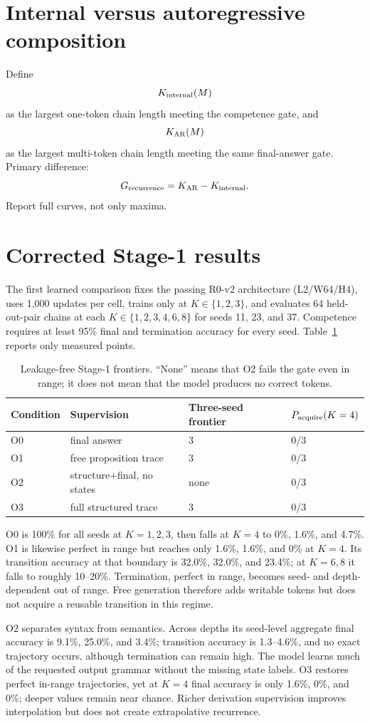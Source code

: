 \documentclass[10pt]{article}
\begin{document}
\section{Internal versus autoregressive composition}
Define
\[
K_{\rm internal}(M)
\]
as the largest one-token chain length meeting the competence gate, and
\[
K_{\rm AR}(M)
\]
as the largest multi-token chain length meeting the same final-answer gate. Primary difference:
\[
G_{\rm recurrence}=K_{\rm AR}-K_{\rm internal}.
\]
Report full curves, not only maxima.

\section{Corrected Stage-1 results}
The first learned comparison fixes the passing R0-v2 architecture (L2/W64/H4), uses 1,000 updates per cell, trains only at $K\in\{1,2,3\}$, and evaluates 64 held-out-pair chains at each $K\in\{1,2,3,4,6,8\}$ for seeds 11, 23, and 37. Competence requires at least 95\% final and termination accuracy for every seed. Table~\ref{tab:frontier} reports only measured points.

\begin{table}[H]\centering\small
\begin{tabular}{llll}
\toprule
Condition & Supervision & Three-seed frontier & $P_{\rm acquire}(K=4)$\\\midrule
O0 & final answer & 3 & 0/3\\
O1 & free proposition trace & 3 & 0/3\\
O2 & structure+final, no states & none & 0/3\\
O3 & full structured trace & 3 & 0/3\\
\bottomrule
\end{tabular}
\caption{Leakage-free Stage-1 frontiers. ``None'' means that O2 fails the gate even in range; it does not mean that the model produces no correct tokens.}\label{tab:frontier}
\end{table}

O0 is 100\% for all seeds at $K=1,2,3$, then falls at $K=4$ to 0\%, 1.6\%, and 4.7\%. O1 is likewise perfect in range but reaches only 1.6\%, 1.6\%, and 0\% at $K=4$. Its transition accuracy at that boundary is 32.0\%, 32.0\%, and 23.4\%; at $K=6,8$ it falls to roughly 10--20\%. Termination, perfect in range, becomes seed- and depth-dependent out of range. Free generation therefore adds writable tokens but does not acquire a reusable transition in this regime.

O2 separates syntax from semantics. Across depths its seed-level aggregate final accuracy is 9.1\%, 25.0\%, and 3.4\%; transition accuracy is 1.3--4.6\%, and no exact trajectory occurs, although termination can remain high. The model learns much of the requested output grammar without the missing state labels. O3 restores perfect in-range trajectories, yet at $K=4$ final accuracy is only 1.6\%, 0\%, and 0\%; deeper values remain near chance. Richer derivation supervision improves interpolation but does not create extrapolative recurrence.
\end{document}
